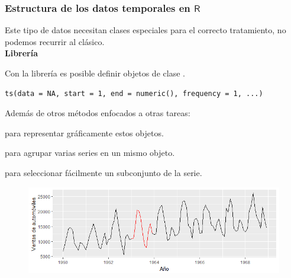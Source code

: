 \documentclass[10pt,a4paper,twoside]{beamer}
\begin{document}
\begin{frame}[fragile]
\frametitle{Estructura de los datos temporales en $\textsf{R}$}

Este tipo de datos necesitan clases especiales para el correcto tratamiento, no podemos recurrir al  clásico.\\
\vspace{0.2cm}
\textbf{Librería }
\begin{itemize*}
\item Con la librería  es posible definir objetos de clase .
\begin{Verbatim}[fontsize=\footnotesize]
    ts(data = NA, start = 1, end = numeric(), frequency = 1, ...)
\end{Verbatim}
\item Además de otros métodos enfocados a otras tareas:
    \begin{itemize*}
    \item {} para representar gráficamente estos objetos.
    \item {} para agrupar varias series en un mismo objeto.
    \item {} para seleccionar fácilmente un subconjunto de la serie.
    \end{itemize*}
\end{itemize*}

\begin{figure}
    \centering
    \centerline{\includegraphics[scale = 0.4]{Images/window.png}}
    \label{window}
\end{figure}

\end{frame}

\end{document}
